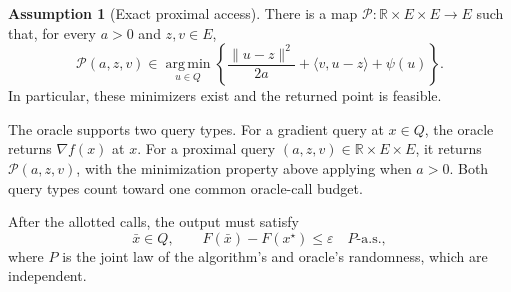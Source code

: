 \documentclass[10pt]{article}
\theoremstyle{definition}
\newtheorem{assumption}{Assumption}
\begin{document}
\begin{assumption}[Exact proximal access]
There is a map $\mathcal{P}:\mathbb{R}\times E\times E\to E$ such that, for every $a>0$ and $z,v\in E$,
\[
\mathcal{P}(a,z,v)\in
\operatorname*{arg\,min}_{u\in Q}
\left\{
\frac{\|u-z\|^2}{2a}
+\langle v,u-z\rangle+\psi(u)
\right\}.
\]
In particular, these minimizers exist and the returned point is feasible.
\end{assumption}

The oracle supports two query types. For a gradient query at $x\in Q$, the oracle returns $\nabla f(x)$ at $x$. For a proximal query $(a,z,v)\in\mathbb{R}\times E\times E$, it returns $\mathcal{P}(a,z,v)$, with the minimization property above applying when $a>0$. Both query types count toward one common oracle-call budget.

After the allotted calls, the output must satisfy
\[
\bar{x}\in Q,
\qquad F(\bar{x})-F(x^\star)\leq\varepsilon
\quad P\text{-a.s.},
\]
where $P$ is the joint law of the algorithm's and oracle's randomness, which are independent.
\end{document}
